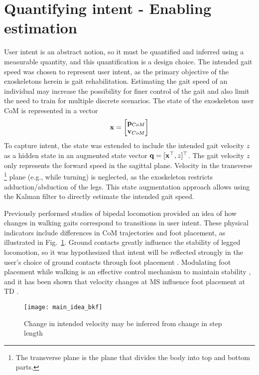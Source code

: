 \section{Quantifying intent - Enabling estimation}\label{sec:quantification}
User intent is an abstract notion, so it must be quantified and inferred using a measurable quantity, and this quantification is a design choice. The intended gait speed was chosen to represent user intent, as the primary objective of the exoskeletons herein is gait rehabilitation. Estimating the gait speed of an individual may increase the possibility for finer control of the gait and also limit the need to train for multiple discrete scenarios. The state of the exoskeleton user CoM is represented in a vector 
\[
	\mathbf{x} = \begin{bmatrix}
		\mathbf{p}_{CoM} \\
		\mathbf{v}_{CoM}
	\end{bmatrix}
\] 
To capture intent, the state was extended to include the intended gait velocity $ z $ as a hidden state in an augmented state vector $ \mathbf{q} = [\mathbf{x}^{\top} ,z]^{\top} $. The gait velocity $ z $ only represents the forward speed in the sagittal plane. Velocity in the transverse \footnote{The transverse plane is the plane that divides the body into top and bottom parts. } plane (e.g., while turning) is neglected, as the exoskeleton restricts adduction/abduction of the legs. This state augmentation approach allows using the Kalman filter to directly estimate the intended gait speed. 

Previously performed studies of bipedal locomotion provided an idea of how changes in walking gaits correspond to transitions in user intent. These physical indicators include differences in CoM trajectories and foot placement, as illustrated in Fig.~\ref{fig:main_idea}. Ground contacts greatly influence the stability of legged locomotion, so it was hypothesized that intent will be reflected strongly in the user's choice of ground contacts through foot placement \cite{bhounsule2014foot}. Modulating foot placement while walking is an effective control mechanism to maintain stability \cite{hof2010balance,bhounsule2015control}, and it has been shown that velocity changes at MS influence foot placement at TD \cite{wang2014stepping,redfern1994model}. 
%
\begin{figure}
	\centering
	\texttt{[image: main\_idea\_bkf]}
	\caption{Change in intended velocity may be inferred from change in step length}\label{fig:main_idea}
\end{figure}

